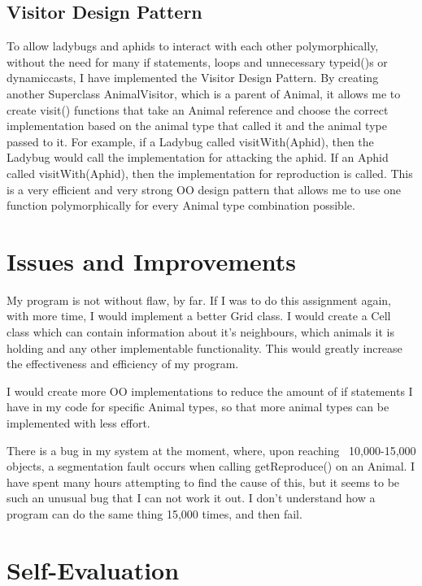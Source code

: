 \documentclass[11pt, article]{article}
\begin{document}
	\subsection{Visitor Design Pattern}
	
	To allow ladybugs and aphids to interact with each other polymorphically, without the need for many if statements, loops and unnecessary typeid()s or dynamiccasts, I have implemented the Visitor Design Pattern. By creating another Superclass AnimalVisitor, which is a parent of Animal, it allows me to create visit() functions that take an Animal reference and choose the correct implementation based on the animal type that called it and the animal type passed to it. For example, if a Ladybug called visitWith(Aphid), then the Ladybug would call the implementation for attacking the aphid. If an Aphid called visitWith(Aphid), then the implementation for reproduction is called. This is a very efficient and very strong OO design pattern that allows me to use one function polymorphically for every Animal type combination possible. 
	
	\section{Issues and Improvements}
	
	My program is not without flaw, by far. If I was to do this assignment again, with more time, I would implement a better Grid class. I would create a Cell class which can contain information about it's neighbours, which animals it is holding and any other implementable functionality. This would greatly increase the effectiveness and efficiency of my program. 
	
	I would create more OO implementations to reduce the amount of if statements I have in my code for specific Animal types, so that more animal types can be implemented with less effort. 
	
	There is a bug in my system at the moment, where, upon reaching ~10,000-15,000 objects, a segmentation fault occurs when calling getReproduce() on an Animal. I have spent many hours attempting to find the cause of this, but it seems to be such an unusual bug that I can not work it out. I don't understand how a program can do the same thing 15,000 times, and then fail. 

	\section{Self-Evaluation}
	
\end{document}
